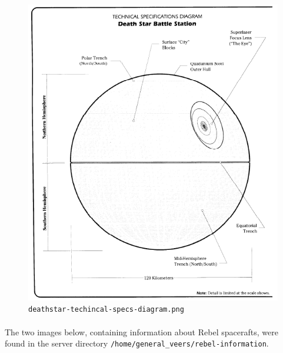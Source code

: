 \documentclass{article}
\begin{document}
\begin{figure}[H]
	\includegraphics[width=\linewidth]{resources/plans/deathstar-technical-specs-diagram.png}
	\caption{\texttt{deathstar-techincal-specs-diagram.png}}
	\label{fig:deathstar-technical-specs-diagram}
\end{figure}

\paragraph{}
The two images below, containing information about Rebel spacerafts, were found in the server directory \texttt{/home/general\_veers/rebel-information}.
\end{document}
